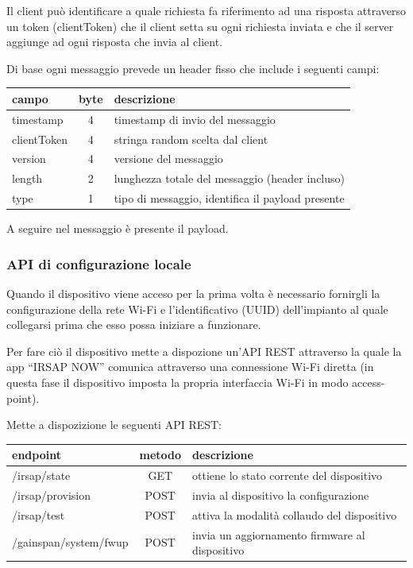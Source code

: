 \documentclass[a4paper,titlepage]{article}
\begin{document}
Il client può identificare a quale richiesta fa riferimento ad una risposta attraverso un
token (clientToken) che il client setta su ogni richiesta inviata e che il server aggiunge
ad ogni risposta che invia al client.

Di base ogni messaggio prevede un header fisso che include i seguenti campi:

\begin{center}
\begin{tabular}{| l | c | l |}
    \hline
    \textbf{campo} & \textbf{byte} & \textbf{descrizione} \\
    \hline
    timestamp & 4 & timestamp di invio del messaggio \\
    \hline
    clientToken & 4 & stringa random scelta dal client \\
    \hline
    version & 4 & versione del messaggio \\
    \hline
    length & 2 & lunghezza totale del messaggio (header incluso) \\
    \hline
    type & 1 & tipo di messaggio, identifica il payload presente \\
    \hline
\end{tabular}
\end{center}

A seguire nel messaggio è presente il payload.

\subsubsection{API di configurazione locale}

Quando il dispositivo viene acceso per la prima volta è necessario fornirgli la
configurazione della rete Wi-Fi e l'identificativo (UUID) dell'impianto al quale
collegarsi prima che esso possa iniziare a funzionare.

Per fare ciò il dispositivo mette a dispozione un'API REST attraverso la quale la
app ``IRSAP NOW'' comunica attraverso una connessione Wi-Fi diretta (in questa fase
il dispositivo imposta la propria interfaccia Wi-Fi in modo access-point).

Mette a dispozizione le seguenti API REST:

\begin{center}
\begin{tabular}{| l | c | l |}
    \hline
    \textbf{endpoint} & \textbf{metodo} & \textbf{descrizione} \\
    \hline
    /irsap/state & GET & ottiene lo stato corrente del dispositivo \\
    \hline
    /irsap/provision & POST & invia al dispositivo la configurazione \\
    \hline
    /irsap/test & POST & attiva la modalità collaudo del dispositivo \\
    \hline
    /gainspan/system/fwup & POST & invia un aggiornamento firmware al dispositivo \\
    \hline
\end{tabular}
\end{center}
\end{document}
